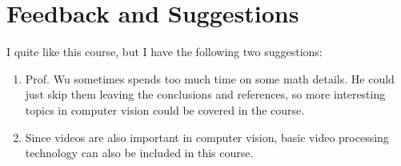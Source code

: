 \documentclass[paper=a4, fontsize=11pt]{scrartcl} %
\numberwithin{equation}{section} %
\numberwithin{figure}{section} %
\numberwithin{table}{section} %
\begin{document}
\section*{Feedback and Suggestions}
I quite like this course, but I have the following two suggestions:
\begin{enumerate}
	\item Prof. Wu sometimes spends too much time on some math details. He could just skip them leaving the conclusions and references, so more interesting topics in computer vision could be covered in the course.
	\item Since videos are also important in computer vision, basic video processing technology can also be included in this course.
\end{enumerate}
\end{document}
